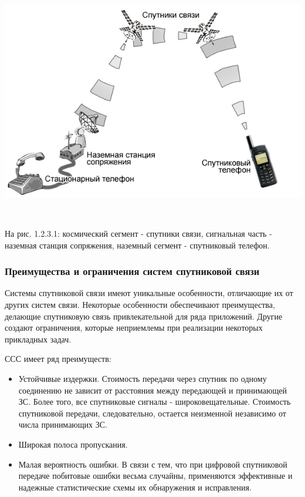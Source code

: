 \documentclass[a4paper]{report}
\begin{document}
\includegraphics[scale=0.7]{70}
{\\}

~

На рис. 1.2.3.1: космический сегмент - спутники связи, сигнальная часть - наземная станция сопряжения, наземный сегмент - спутниковый телефон.

\subsubsection{Преимущества и ограничения систем спутниковой связи}
Системы спутниковой связи имеют уникальные особенности, отличающие их от других систем связи. Некоторые особенности обеспечивают преимущества, делающие спутниковую связь привлекательной для ряда приложений. Другие создают ограничения, которые неприемлемы при реализации некоторых прикладных задач.

ССС имеет ряд преимуществ:
\begin{itemize}
\item Устойчивые издержки. Стоимость передачи через спутник по одному соединению не зависит от расстояния между передающей и принимающей ЗС. Более того, все спутниковые сигналы - широковещательные. Стоимость спутниковой передачи, следовательно, остается неизменной независимо от числа принимающих ЗС.
\item Широкая полоса пропускания.
\item Малая вероятность ошибки. В связи с тем, что при цифровой спутниковой передаче побитовые ошибки весьма случайны, применяются эффективные и надежные статистические схемы их обнаружения и исправления.
\end{itemize}
\end{document}
